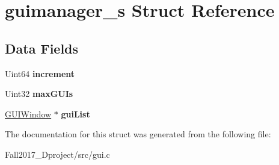 \hypertarget{structguimanager__s}{}\section{guimanager\+\_\+s Struct Reference}
\label{structguimanager__s}
\subsection*{Data Fields}
\begin{DoxyCompactItemize}
\item 
\mbox{\label{structguimanager__s_ab08657e2d8ce2eb598d448722ef0959b}} 
Uint64 {\bfseries increment}
\item 
\mbox{\label{structguimanager__s_a74f8a2d00fbe7d37b7561bafc55e54c2}} 
Uint32 {\bfseries max\+G\+U\+Is}
\item 
\mbox{\label{structguimanager__s_ab4b2fa244546531438ab1e3d2aa6d403}} 
\hyperlink{structguiwindow__s}{G\+U\+I\+Window} $\ast$ {\bfseries gui\+List}
\end{DoxyCompactItemize}


The documentation for this struct was generated from the following file\+:\begin{DoxyCompactItemize}
\item 
Fall2017\+\_\+Dproject/src/gui.\+c\end{DoxyCompactItemize}
